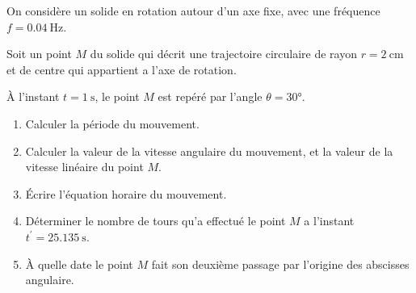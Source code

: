 On considère un solide en rotation autour d'un axe fixe, avec une fréquence
$f=\qty{0.04}{\hertz}$.

Soit un point $M$ du solide qui décrit une trajectoire circulaire de rayon
$r=\qty{2}{\cm}$ et de centre qui appartient a l'axe de rotation.

À l'instant $t=\qty{1}{\second}$, le point $M$ est repéré par l'angle
$\theta=\ang{30}$.

\begin{enumerate}
    \item Calculer la période du mouvement.
    \item Calculer la valeur de la vitesse angulaire du mouvement, et la valeur
          de la vitesse linéaire du point $M$.
    \item Écrire l'équation horaire du mouvement.
    \item Déterminer le nombre de tours qu'a effectué le point $M$ a l'instant
          $t^{\prime}=\qty{25,135}{\second}$.
    \item À quelle date le point $M$ fait son deuxième passage par l'origine des
          abscisses angulaire.
\end{enumerate}
